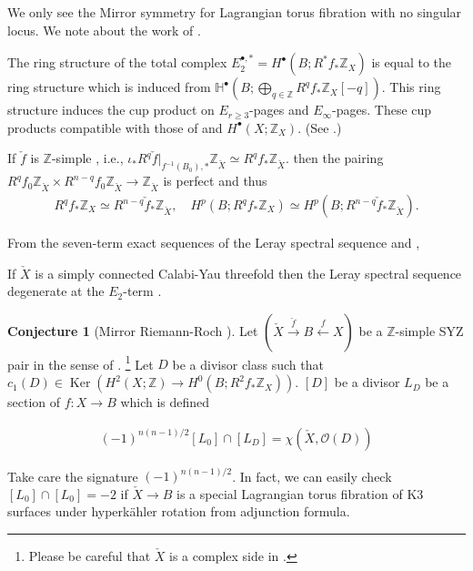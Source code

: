 \documentclass[a4paper,dvipdfmx,reqno,12pt]{amsart}
\theoremstyle{definition}
\newtheorem{Conj}[Thm]{Conjecture}
\newcommand{\Z}{\mathbb{Z}}%
\newcommand{\mb}[1]{\mathbb{#1}}%
\newcommand{\mcal}[1]{\mathcal{#1}}%
\newcommand{\opn}[1]{\operatorname{#1}}
\newcommand{\xto}[1]{\xrightarrow{#1}}
\newcommand{\xgets}[1]{\xleftarrow{#1}}
\numberwithin{equation}{section}
\begin{document}
We only see the Mirror symmetry for Lagrangian torus fibration
with no singular locus.
We note about the work of 
\cite{grossSpecialLagrangianFibrations1998a,grossSpecialLagrangianFibrations1999}.



The ring structure of the total complex $E_2^{\bullet,*}=H^{\bullet}(B;R^{*}f_*\Z_X)$
is equal to the ring structure which is induced from 
$\mb{H}^{\bullet}(B;\bigoplus_{q\in \Z}R^{q}f_*\Z_X[-q])$. This ring structure induces
the cup product on $E_{r\geq 3}$-pages and $E_{\infty}$-pages.
These cup products compatible with those of 
 and $H^{\bullet}(X;\Z_X)$. (See \cite[IV 6.8., Appendix A]{bredonSheafTheory1997a}.)

If $\check{f}$ is $\Z$-simple \cite[Definition 2.1]{grossSpecialLagrangianFibrations1998a} 
, i.e., $\iota_*R^{q}\check{f}|_{f^{-1}(B_0),*}\Z_{\check{X}}\simeq R^{q}f_*\Z_{\check{X}}$.
then the pairing $R^{q}f_0\Z_{\check{X}} \times R^{n-q}f_0\Z_{\check{X}}\to \Z_{\check{X}}$
is perfect and thus
\begin{align}
R^{q}f_*\Z_X\simeq R^{n-q}\check{f}_*\Z_{\check{X}},
\quad H^{p}(B;R^{q}f_*\Z_X)\simeq H^{p}(B;R^{n-q}\check{f}_*\Z_{\check{X}}).
\end{align}

From the seven-term exact sequences of the Leray spectral sequence and \cite[Remark ]{}, 


If $\check{X}$ is a simply connected Calabi-Yau threefold then the Leray 
spectral sequence degenerate at the $E_2$-term \cite[Theorem 3.9]{}.

\begin{Conj}[{Mirror Riemann-Roch \cite[Conjecture 4.9]{grossSpecialLagrangianFibrations1998a}}]
Let $(\check{X} \xto{\check{f}} B \xgets{f} X)$ be a $\Z$-simple SYZ pair in the sense of 
\cite[Definition 2.1, 2.3]{grossSpecialLagrangianFibrations1998a}.
\footnote{Please be careful that $\check{X}$ is a complex side in 
\cite{grossSpecialLagrangianFibrations1998a}.}
Let $D$ be a divisor class such that
$c_1(D)\in\opn{Ker}(H^{2}(X;\Z)\to H^{0}(B;R^{2}f_*\Z_{X}))$.
$[D]$ be a divisor
$L_{D}$ be a section of $f:X\to B$ which is defined

\begin{align}
    (-1)^{n(n-1)/2}[L_0] \cap [L_D]=\chi(\check{X},\mcal{O}(D))
  \end{align}
\end{Conj}

Take care the signature $(-1)^{n(n-1)/2}$. In fact, we can easily check $[L_0]\cap [L_0]=-2$ if $\check{X}\to B$ is a special Lagrangian torus fibration of K3 surfaces under hyperk\"ahler rotation from adjunction formula.
\end{document}
